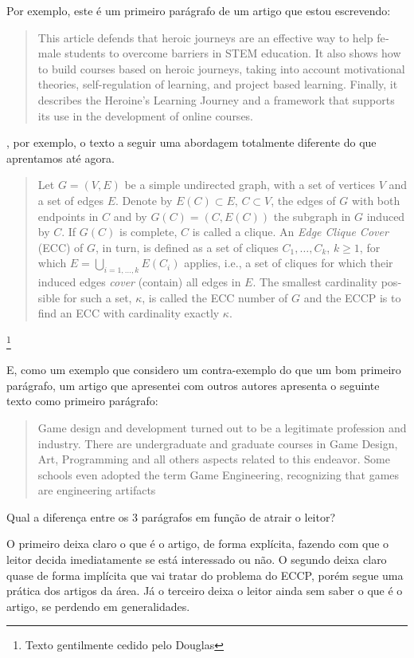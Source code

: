 \documentclass[openany]{book}
\begin{document}
 Por exemplo, este é um primeiro parágrafo de um artigo que estou escrevendo:

\foreignblockquote{english}{This article defends that heroic journeys are an effective way to help female students to overcome barriers in STEM education.
It also shows how to build courses based on heroic journeys, taking into account motivational theories, self-regulation of learning, and project based learning. Finally, it describes the Heroine's Learning  Journey and a framework that  supports its use in the development of online courses.}

, por exemplo, o texto a seguir uma abordagem totalmente diferente do que aprentamos até agora.

\foreignblockquote{english}{Let $G = (V,E)$ be a simple undirected graph, with a set of vertices $V$ and a set of edges $E$. Denote by $E(C) \subset E$, $C \subset V$, the edges of $G$ with both endpoints in $C$ and by $G(C) = (C,E(C))$ the subgraph in $G$ induced by $C$. If $G(C)$ is complete, $C$ is called a clique. An \textit{Edge Clique Cover} (ECC) of $G$, in turn, is defined as a set of cliques ${C_1,\ldots,C_k}$, $k \geq 1$, for which $E = \bigcup_{i=1,\ldots,k}E(C_i)$ applies, i.e., a set of cliques for which their induced edges \textit{cover} (contain) all edges in $E$. The smallest cardinality possible for such a set, $\kappa$, is called the ECC number of $G$ and the ECCP is to find an ECC with cardinality exactly $\kappa$.}\footnote{Texto gentilmente cedido pelo Douglas}

E, como um exemplo que considero um contra-exemplo do que um bom primeiro parágrafo, um artigo que apresentei com outros autores apresenta o seguinte texto como primeiro parágrafo:

\foreignblockquote{english}{Game design and development turned out to be a legitimate profession and industry. There are undergraduate and graduate courses in Game Design, Art, Programming and all others aspects related to this endeavor. Some schools even adopted the term Game Engineering, recognizing that games are engineering artifacts}

Qual a diferença entre os 3 parágrafos em função de atrair o leitor?

O primeiro deixa claro o que é o artigo, de forma explícita, fazendo com que o leitor decida imediatamente se está interessado ou não. O segundo deixa claro quase de forma implícita que vai tratar do problema do ECCP, porém segue uma prática dos artigos da área. Já o terceiro deixa o leitor ainda sem saber o que é o artigo, se perdendo em generalidades.
\end{document}
